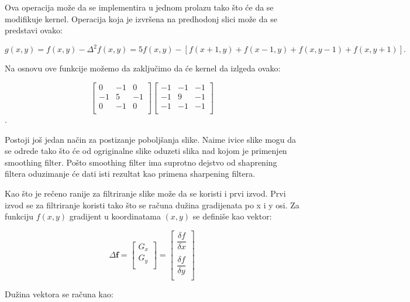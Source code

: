 \documentclass[a4paper,12pt,titlepage]{article}
\begin{document}
Ova operacija može da se implementira u jednom prolazu tako što će da se modifikuje kernel. Operacija koja je izvršena na predhodonj slici može da se predstavi ovako:

\begin{equation}\label{eq:grad10}
g(x, y) = f(x, y) - \Delta^{2}f(x, y) = 5f(x, y) - [f(x + 1, y) + f(x - 1, y) + f(x, y - 1) + f(x, y + 1)].
\end{equation} 

Na osnovu ove funkcije možemo da zaključimo da će kernel da izlgeda ovako:

\[
\begin{bmatrix}
     0 & -1 & 0 \\
     -1 & 5 & -1 \\
     0 & -1 & 0 \\
\end{bmatrix}
\begin{bmatrix}
     -1 & -1 & -1 \\
     -1 & 9 & -1 \\
     -1 & -1 & -1 \\
\end{bmatrix}
\]. 

Postoji još jedan način za postizanje poboljšanja slike. Naime ivice slike mogu da se odrede tako što će od ogriginalne slike oduzeti slika nad kojom je primenjen smoothing filter. Pošto smoothing filter ima suprotno dejstvo od shaprening filtera oduzimanje će dati isti rezultat kao primena sharpening filtera. 

Kao što je rečeno ranije za filtriranje slike može da se koristi i prvi izvod. Prvi izvod se za filtriranje koristi tako što se računa dužina gradijenata po x i y osi. Za funkciju $f(x, y)$ gradijent u koordinatama $(x, y)$ se definiše kao vektor: 

\begin{equation}\label{eq:grad11}
\Delta \textbf{f}
=
\begin{bmatrix}
     G_{x} \\
     G_{y} \\
\end{bmatrix}
=
\begin{bmatrix}
     \dfrac{\delta f}{\delta x} \\
     \\
     \dfrac{\delta f}{\delta y} \\
\end{bmatrix}
\end{equation}

Dužina vektora se računa kao: 
\end{document}
